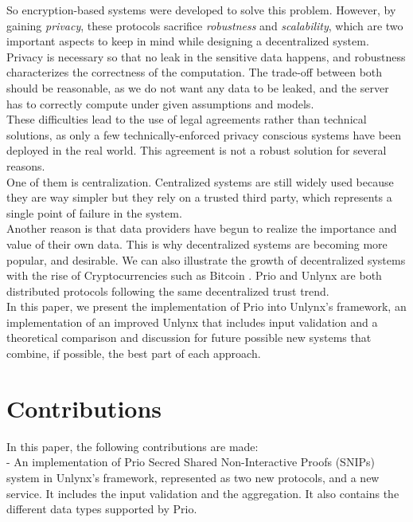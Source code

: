 \documentclass{article}
\begin{document}
So encryption-based systems were developed to solve this problem.
However, by gaining \textit{privacy}, these protocols sacrifice \textit{robustness} and \textit{scalability}, which are two important aspects to keep in mind while designing a decentralized system. Privacy is necessary so that no leak in the sensitive data happens, and robustness characterizes the correctness of the computation. The trade-off between both should be reasonable, as we do not want any data to be leaked, and the server has to correctly compute under given assumptions and models.\\
These difficulties lead to the use of legal agreements rather than technical solutions, as only a few technically-enforced privacy conscious systems have been deployed in the real world. This agreement is not a robust solution for several reasons.\\
One of them is centralization. Centralized systems are still widely used \cite{dyadic, centralized} because they are way simpler but they rely on a trusted third party, which represents a single point of failure in the system.\\
Another reason is that data providers have begun to realize the importance and value of their own data.
This is why decentralized systems are becoming more popular, and desirable. We can also illustrate the growth of decentralized systems with the rise of Cryptocurrencies such as Bitcoin \cite{bitcoin}. Prio and Unlynx are both distributed protocols following the same decentralized trust trend.\\
In this paper, we present the implementation of Prio into Unlynx's framework, an implementation of an improved Unlynx that includes input validation and a theoretical comparison and discussion for future possible new systems that combine, if possible, the best part of each approach.
	
\section*{Contributions}
In this paper, the following contributions are made:\\
- An implementation of Prio Secred Shared Non-Interactive Proofs (SNIPs) system in Unlynx's framework, represented as two new protocols, and a new service. It includes the input validation and the aggregation. It also contains the different data types supported by Prio.\\
\end{document}
